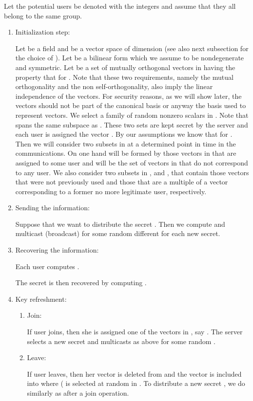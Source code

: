 \documentclass[a4paper,11pt]{amsart}
\theoremstyle{definition}
\begin{document}
Let the potential users be denoted with the integers  and
assume that they all belong to the same group.
\begin{enumerate}

\item Initialization step:

  Let  be a field and  be a  vector space of dimension
   (see also next subsection for the choice of ).  Let
   be a bilinear form which we assume to be nondegenerate and
  symmetric.  Let  be a set
  of  mutually orthogonal vectors in  having the property that
   for . Note that these two requirements, namely the mutual orthogonality and the non self-orthogonality, also imply the linear independence of the vectors. For security reasons, as we will show later, the vectors should not be part of the
  canonical basis or anyway the basis used to represent vectors.  We
  select a family  of random nonzero scalars in
  .  Note that  spans the same subspace as . These two sets are kept secret
  by the server and each user  is assigned the vector
  . By our assumptions we know that
   for . Then we
  will consider two subsets in  at a determined point in time in
  the communications. On one hand  will be formed by those
  vectors in  that are assigned to some user and  will be
  the set of vectors in  that do not correspond to any user. We
  also consider two subsets in ,  and , that
  contain those vectors that were not previously used and those that
  are a multiple of a vector corresponding to a former no more
  legitimate user, respectively.


\item Sending the information:

  Suppose that we want to distribute the secret . Then we
  compute and multicast (broadcast)  for some random  different for each new secret.
\item Recovering the information:

  Each user computes .

  The secret  is then recovered by computing .

\item Key refreshment:

  \begin{enumerate}

  \item Join:

If user  joins, then she is assigned one of the vectors in
    , say . The server selects a new
    secret  and multicasts as above 
    for some random .

  \item Leave:

    If user  leaves, then her vector  is deleted from  and the vector
     is included into  where
     ( is selected at random in . To distribute a
    new secret , we do similarly as after a join
    operation. 

  \end{enumerate}

\end{enumerate}
\end{document}
